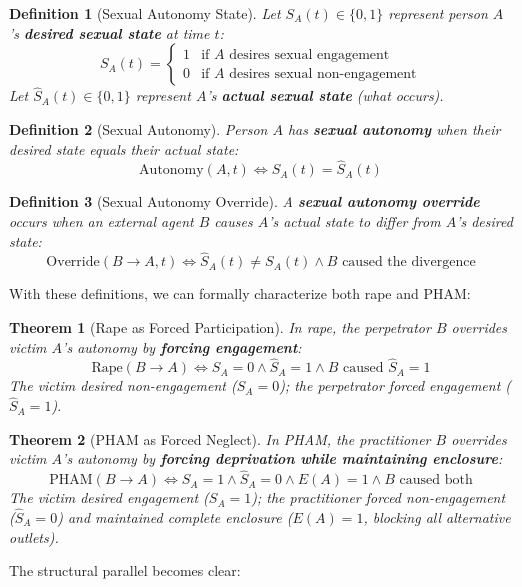 \documentclass[12pt,openany]{book}
\newtheorem{definition}{Definition}[chapter]
\newtheorem{theorem}{Theorem}[chapter]
\numberwithin{equation}{chapter}
\begin{document}
\begin{definition}[Sexual Autonomy State]
Let $S_A(t) \in \{0, 1\}$ represent person $A$'s \textbf{desired sexual state} at time $t$:
\[
S_A(t) = \begin{cases}
1 & \text{if } A \text{ desires sexual engagement} \\
0 & \text{if } A \text{ desires sexual non-engagement}
\end{cases}
\]
Let $\hat{S}_A(t) \in \{0, 1\}$ represent $A$'s \textbf{actual sexual state} (what occurs).
\end{definition}

\begin{definition}[Sexual Autonomy]
Person $A$ has \textbf{sexual autonomy} when their desired state equals their actual state:
\[
\text{Autonomy}(A, t) \iff S_A(t) = \hat{S}_A(t)
\]
\end{definition}

\begin{definition}[Sexual Autonomy Override]
A \textbf{sexual autonomy override} occurs when an external agent $B$ causes $A$'s actual state to differ from $A$'s desired state:
\[
\text{Override}(B \rightarrow A, t) \iff \hat{S}_A(t) \neq S_A(t) \land B \text{ caused the divergence}
\]
\end{definition}

With these definitions, we can formally characterize both rape and PHAM:

\begin{theorem}[Rape as Forced Participation]
In rape, the perpetrator $B$ overrides victim $A$'s autonomy by \textbf{forcing engagement}:
\[
\text{Rape}(B \rightarrow A) \iff S_A = 0 \land \hat{S}_A = 1 \land B \text{ caused } \hat{S}_A = 1
\]
The victim desired non-engagement ($S_A = 0$); the perpetrator forced engagement ($\hat{S}_A = 1$).
\end{theorem}

\begin{theorem}[PHAM as Forced Neglect]
In PHAM, the practitioner $B$ overrides victim $A$'s autonomy by \textbf{forcing deprivation while maintaining enclosure}:
\[
\text{PHAM}(B \rightarrow A) \iff S_A = 1 \land \hat{S}_A = 0 \land E(A) = 1 \land B \text{ caused both}
\]
The victim desired engagement ($S_A = 1$); the practitioner forced non-engagement ($\hat{S}_A = 0$) \textit{and} maintained complete enclosure ($E(A) = 1$, blocking all alternative outlets).
\end{theorem}

The structural parallel becomes clear:
\end{document}
